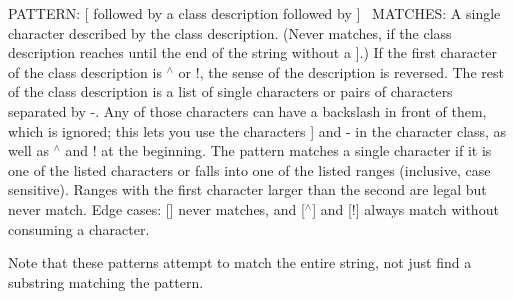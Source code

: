 P\+A\+T\+T\+E\+RN\+: \mbox{[} followed by a class description followed by \mbox{]}~\newline
 M\+A\+T\+C\+H\+ES\+: A single character described by the class description. (Never matches, if the class description reaches until the end of the string without a \mbox{]}.) If the first character of the class description is $^\wedge$ or !, the sense of the description is reversed. The rest of the class description is a list of single characters or pairs of characters separated by -\/. Any of those characters can have a backslash in front of them, which is ignored; this lets you use the characters \mbox{]} and -\/ in the character class, as well as $^\wedge$ and ! at the beginning. The pattern matches a single character if it is one of the listed characters or falls into one of the listed ranges (inclusive, case sensitive). Ranges with the first character larger than the second are legal but never match. Edge cases\+: \mbox{[}\mbox{]} never matches, and \mbox{[}$^\wedge$\mbox{]} and \mbox{[}!\mbox{]} always match without consuming a character.

Note that these patterns attempt to match the entire string, not just find a substring matching the pattern.


